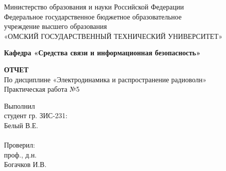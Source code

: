 \documentclass[fontsize=14pt,a4paper]{scrartcl}
\begin{document}
  \begin{titlepage}                                                         
    \newpage                                                                        
    \begin{center}   
      Министерство образования и науки Российской Федерации  \\ 
      \vspace{1em}                                                    
      {\mdseries
        Федеральное государственное бюджетное образовательное \\
        учреждение высшего образования \\
        «ОМСКИЙ ГОСУДАРСТВЕННЫЙ ТЕХНИЧЕСКИЙ УНИВЕРСИТЕТ»
      }                               
      \vspace{1em}      

      {\bfseries Кафедра «Средства связи и информационная безопасность»}  

      \vspace{\fill}                                                         
                                   
      {\bfseries ОТЧЕТ } \\                                 
      По дисциплине «Электродинамика и распространение радиоволн» \\ 
      \vspace{1em} 
      Практическая работа №5 \\                                                           
    \end{center}                                                          
                                                                                        
    \vspace{\fill}                                                         
                                                                                        
    \hfill\parbox{5cm}{
      Выполнил\\
      студент гр. ЗИС-231:\\
      Белый В.Е. \\
      \\
      Проверил:\\
      проф., д.н. \\
      Богачков И.В.\\
    }                                                                                                                              
                                                                                                                                                                              

\end{titlepage}
\end{document}

